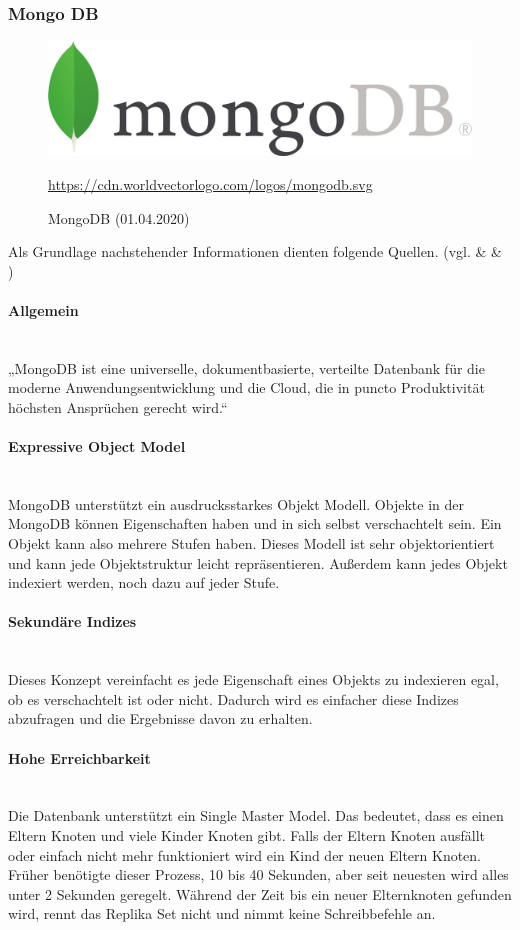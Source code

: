 \subsubsection{Mongo DB}\label{ssec:MongoDB}
\begin{figure}
\centering
	\includegraphics[scale=0.05]{images/MongoDB.png}
	\caption[MongoDB (01.04.2020)]{MongoDB (01.04.2020)}
	\url{https://cdn.worldvectorlogo.com/logos/mongodb.svg}
	\label{fig:sample}
\end{figure}
Als Grundlage nachstehender Informationen dienten folgende Quellen. (vgl. \cite{mongodb_beliebteste_2020} \& \cite{scale_cassandra_2020} \& \cite{jepsen_jepsen_2020})
\paragraph{Allgemein}\mbox{} \\	
„MongoDB ist eine universelle, dokumentbasierte, verteilte Datenbank für die moderne Anwendungsentwicklung und die Cloud, die in puncto Produktivität höchsten Ansprüchen gerecht wird.“~\cite{mongodb_beliebteste_2020}

\paragraph{Expressive Object Model}\mbox{} \\
MongoDB unterstützt ein ausdrucksstarkes Objekt Modell. Objekte in der MongoDB können Eigenschaften haben und in sich selbst verschachtelt sein. Ein Objekt kann also mehrere Stufen haben. Dieses Modell ist sehr objektorientiert und kann jede Objektstruktur leicht repräsentieren. Außerdem kann jedes Objekt indexiert werden, noch dazu auf jeder Stufe.
\paragraph{Sekundäre Indizes}\mbox{} \\
Dieses Konzept vereinfacht es jede Eigenschaft eines Objekts zu indexieren egal, ob es verschachtelt ist oder nicht. Dadurch wird es einfacher diese Indizes abzufragen und die Ergebnisse davon zu erhalten.
\paragraph{Hohe Erreichbarkeit}\mbox{} \\
Die Datenbank unterstützt ein Single Master Model. Das bedeutet, dass es einen Eltern Knoten und viele Kinder Knoten gibt. Falls der Eltern Knoten ausfällt oder einfach nicht mehr funktioniert wird ein Kind der neuen Eltern Knoten. Früher benötigte dieser Prozess, 10 bis 40 Sekunden, aber seit neuesten wird alles unter 2 Sekunden geregelt. Während der Zeit bis ein neuer Elternknoten gefunden wird, rennt das Replika Set nicht und nimmt keine Schreibbefehle an. \\
\newpage
